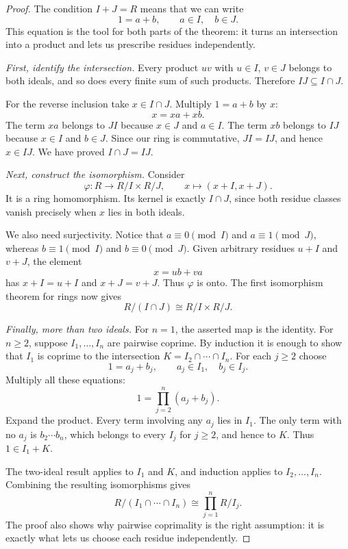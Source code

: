 \begin{proof}
The condition $I+J=R$ means that we can write
\[
1=a+b,\qquad a\in I,\quad b\in J.
\]
This equation is the tool for both parts of the theorem: it turns an intersection into a product and lets us prescribe residues independently.

\emph{First, identify the intersection.}
Every product $uv$ with $u\in I$, $v\in J$ belongs to both ideals, and so does every finite sum of such products. Therefore $IJ\subseteq I\cap J$.

For the reverse inclusion take $x\in I\cap J$. Multiply $1=a+b$ by $x$:
\[
x=xa+xb.
\]
The term $xa$ belongs to $JI$ because $x\in J$ and $a\in I$. The term $xb$ belongs to $IJ$ because $x\in I$ and $b\in J$. Since our ring is commutative, $JI=IJ$, and hence $x\in IJ$. We have proved $I\cap J=IJ$.

\emph{Next, construct the isomorphism.}
Consider
\[
\varphi:R\to R/I\times R/J,
\qquad x\mapsto(x+I,x+J).
\]
It is a ring homomorphism. Its kernel is exactly $I\cap J$, since both residue classes vanish precisely when $x$ lies in both ideals.

We also need surjectivity. Notice that $a\equiv0\pmod I$ and $a\equiv1\pmod J$, whereas $b\equiv1\pmod I$ and $b\equiv0\pmod J$. Given arbitrary residues $u+I$ and $v+J$, the element
\[
x=ub+va
\]
has $x+I=u+I$ and $x+J=v+J$. Thus $\varphi$ is onto. The first isomorphism theorem for rings now gives
\[
\boxed{R/(I\cap J)\cong R/I\times R/J.}
\]

\emph{Finally, more than two ideals.}
For $n=1$, the asserted map is the identity. For $n\ge2$, suppose
$I_1,\ldots,I_n$ are pairwise coprime. By induction it is enough to show that $I_1$ is coprime to the intersection $K=I_2\cap\cdots\cap I_n$. For each $j\ge2$ choose
\[
1=a_j+b_j,\qquad a_j\in I_1,\quad b_j\in I_j.
\]
Multiply all these equations:
\[
1=\prod_{j=2}^n(a_j+b_j).
\]
Expand the product. Every term involving any $a_j$ lies in $I_1$. The only term with no $a_j$ is $b_2\cdots b_n$, which belongs to every $I_j$ for $j\ge2$, and hence to $K$. Thus $1\in I_1+K$.

The two-ideal result applies to $I_1$ and $K$, and induction applies to $I_2,\ldots,I_n$. Combining the resulting isomorphisms gives
\[
\boxed{R/(I_1\cap\cdots\cap I_n)\cong\prod_{j=1}^nR/I_j.}
\]
The proof also shows why pairwise coprimality is the right assumption: it is exactly what lets us choose each residue independently.
\end{proof}

